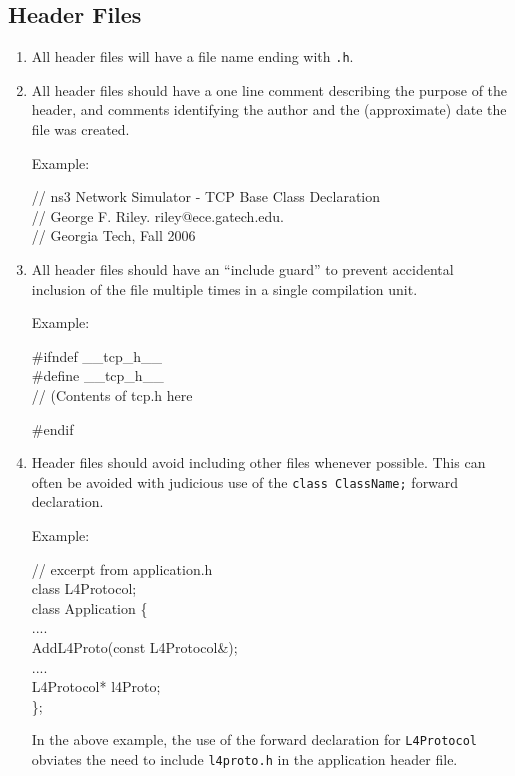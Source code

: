 \documentclass[11pt]{article}
\begin{document}
\subsection{Header Files}
\begin{enumerate}
\item All header files will have a file name ending with {\tt .h}.
\item All header files should have a one line comment describing
the purpose of the header, and comments identifying the
author and the (approximate) date the file was created.

Example:

\begin{tt}
// ns3 Network Simulator - TCP Base Class Declaration \\
// George F. Riley.  riley@ece.gatech.edu. \\
// Georgia Tech, Fall 2006
\end{tt}

\item All header files should have an ``include guard'' to prevent accidental
inclusion of the file multiple times in a single compilation unit.

Example:

\begin{tt}
\#ifndef \_\_tcp\_h\_\_  \\
\#define \_\_tcp\_h\_\_ \\

// (Contents of tcp.h here

\#endif
\end{tt}
\item Header files should avoid including other files whenever possible.
This can often be avoided with judicious use of the
{\tt class ClassName;} forward declaration.  

Example:

\begin{tt}
// excerpt from application.h \\
class L4Protocol; \\

class Application \{ \\
 .... \\
 AddL4Proto(const L4Protocol\&); \\
 .... \\
 L4Protocol* l4Proto; \\
\};
\end{tt}

In the above example, the use of the forward declaration for {\tt L4Protocol}
obviates the need to include {\tt l4proto.h} in the application header
file.

\end{enumerate}
\end{document}
